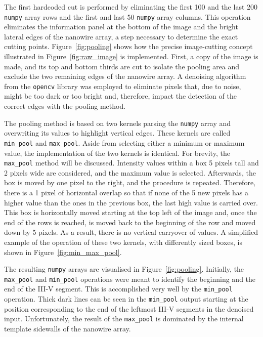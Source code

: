 The first hardcoded cut is performed by eliminating the first \num{100} and the last \num{200} \texttt{numpy} array rows and the first and last \num{50} \texttt{numpy} array columns. This operation eliminates the information panel at the bottom of the image and the bright lateral edges of the nanowire array, a step necessary to determine the exact cutting points. Figure~\ref{fig:pooling} shows how the precise image-cutting concept illustrated in Figure~\ref{fig:raw_image} is implemented. First, a copy of the image is made, and its top and bottom thirds are cut to isolate the pooling area and exclude the two remaining edges of the nanowire array. A denoising algorithm from the \texttt{opencv} library \cite{Bradski2000, opencv} was employed to eliminate pixels that, due to noise, might be too dark or too bright and, therefore, impact the detection of the correct edges with the pooling method.

The pooling method is based on two kernels parsing the \texttt{numpy} array and overwriting its values to highlight vertical edges. These kernels are called \texttt{min\_pool} and \texttt{max\_pool}. Aside from selecting either a minimum or maximum value, the implementation of the two kernels is identical. For brevity, the \texttt{max\_pool} method will be discussed. Intensity values within a box \num{5} pixels tall and \num{2} pixels wide are considered, and the maximum value is selected. Afterwards, the box is moved by one pixel to the right, and the procedure is repeated. Therefore, there is a \num{1} pixel of horizontal overlap so that if none of the \num{5} new pixels has a higher value than the ones in the previous box, the last high value is carried over. This box is horizontally moved starting at the top left of the image and, once the end of the rows is reached, is moved back to the beginning of the row and moved down by \num{5} pixels. As a result, there is no vertical carryover of values. A simplified example of the operation of these two kernels, with differently sized boxes, is shown in Figure~\ref{fig:min_max_pool}.

The resulting \texttt{numpy} arrays are visualised in Figure~\ref{fig:pooling}. Initially, the \texttt{max\_pool} and \texttt{min\_pool} operations were meant to identify the beginning and the end of the III-V segment. This is accomplished very well by the \texttt{min\_pool} operation. Thick dark lines can be seen in the \texttt{min\_pool} output starting at the position corresponding to the end of the leftmost III-V segments in the denoised input. Unfortunately, the result of the \texttt{max\_pool} is dominated by the internal template sidewalls of the nanowire array. 

